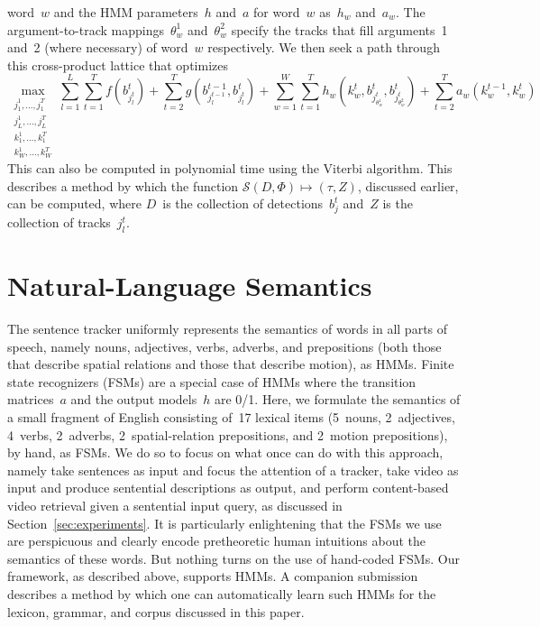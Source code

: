 word~$w$ and the HMM parameters~$h$ and~$a$ for word~$w$ as~$h_w$ and~$a_w$.
%
The argument-to-track mappings~$\theta^1_w$ and~$\theta^2_w$ specify the tracks
that fill arguments~1 and~2 (where necessary) of word~$w$ respectively.
%
We then seek a path through this cross-product lattice that optimizes
%
\vspace*{-2ex}
\begin{equation*}
  \max_{\substack{j^1_1,\ldots,j^T_1\\j^1_L,\ldots,j^T_L\\
      k^1_1,\ldots,k^T_1\\k^1_W,\ldots,k^T_W}}
  \sum_{l=1}^L
  \sum_{t=1}^Tf(b^t_{j^t_l})+
  \sum_{t=2}^Tg(b^{t-1}_{j^{t-1}_l},b^t_{j^t_l})+
  \sum_{w=1}^W
  \sum_{t=1}^Th_w(k^t_w,b^t_{j^t_{\theta^1_w}},b^t_{j^t_{\theta^2_w}})+
  \sum_{t=2}^Ta_w(k^{t-1}_w,k^t_w)
\end{equation*}
%
This can also be computed in polynomial time using the Viterbi algorithm.
%
This describes a method by which the function
$\mathcal{S}(D,\Phi)\mapsto(\tau,Z)$, discussed earlier, can be computed, where
$D$~is the collection of detections~$b^t_j$ and~$Z$ is the collection of
tracks~$j^t_l$.

\vspace*{-2ex}
\section{Natural-Language Semantics}
\label{sec:semantics}
\vspace*{-2ex}

The sentence tracker uniformly represents the semantics of words in all parts
of speech, namely nouns, adjectives, verbs, adverbs, and prepositions (both
those that describe spatial relations and those that describe motion), as HMMs.
%
Finite state recognizers (FSMs) are a special case of HMMs where the transition
matrices~$a$ and the output models~$h$ are 0/1.
%
Here, we formulate the semantics of a small fragment of English consisting
of~17 lexical items (5~nouns, 2~adjectives, 4~verbs, 2~adverbs,
2~spatial-relation prepositions, and 2~motion prepositions), by hand, as FSMs.
%
We do so to focus on what once can do with this approach, namely take sentences
as input and focus the attention of a tracker, take video as input and produce
sentential descriptions as output, and perform content-based video retrieval
given a sentential input query, as discussed in Section~\ref{sec:experiments}.
%
It is particularly enlightening that the FSMs we use are perspicuous and
clearly encode pretheoretic human intuitions about the semantics of these words.
%
But nothing turns on the use of hand-coded FSMs.
%
Our framework, as described above, supports HMMs.
%
A companion submission describes a method by which one can automatically learn
such HMMs for the lexicon, grammar, and corpus discussed in this paper.

